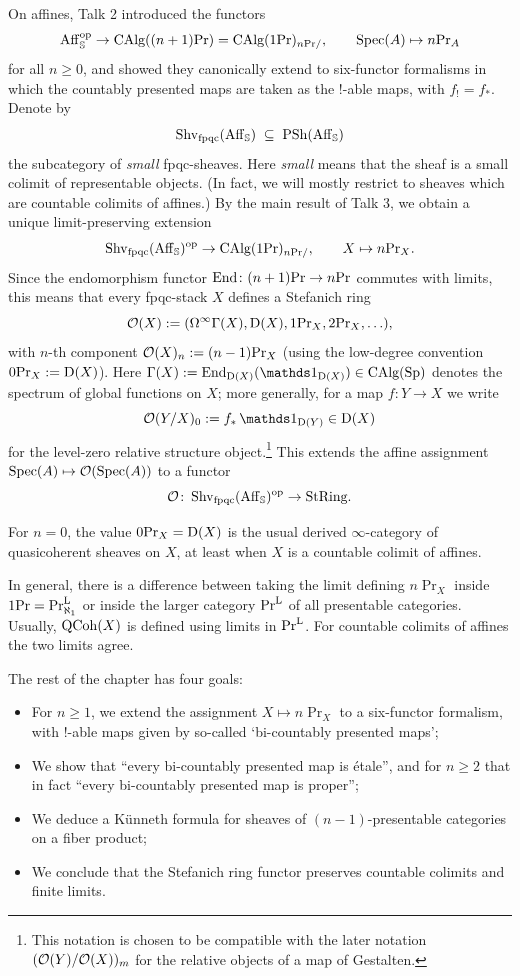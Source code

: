 \documentclass[11pt]{book}
\begin{document}
	On affines, Talk 2 introduced the functors
	\[
		\operatorname{Aff}_{\operatorname{\mathbb S}}^{\textup{op}} \to {\textup{CAlg}}((n+1)\textup{Pr}) = {\textup{CAlg}}(1\textup{Pr})_{n\textup{Pr}/}, \qquad \operatorname{Spec}(A) \mapsto n\textup{Pr}_A
	\]
	for all $n \geq 0$, and showed they canonically extend to six-functor formalisms in which the countably presented maps are taken as the $!$-able maps, with $f_! = f_*$. Denote by
	\[
		\operatorname{Shv}_{\operatorname{fpqc}}(\operatorname{Aff}_{\operatorname{\mathbb S}}) \; \subseteq \; \operatorname{PSh}(\operatorname{Aff}_{\operatorname{\mathbb S}})
	\]	
	the subcategory of \emph{small} fpqc-sheaves. Here \emph{small} means that the sheaf is a small colimit of representable objects. (In fact, we will mostly restrict to sheaves which are countable colimits of affines.) By the main result of Talk 3, we obtain a unique limit-preserving extension
	\[
		\operatorname{Shv}_{\operatorname{fpqc}}(\operatorname{Aff}_{\operatorname{\mathbb S}})^{\textup{op}} \to {\textup{CAlg}}(1\textup{Pr})_{n\textup{Pr}/}, \qquad X \mapsto n\textup{Pr}_X.
	\]
	Since the endomorphism functor $\operatorname{End}\colon (n+1)\textup{Pr} \to n\textup{Pr}$ commutes with limits, this means that every fpqc-stack $X$ defines a Stefanich ring
	\[
		\mathcal{O}(X) := (\Omega^{\infty}\Gamma(X), \operatorname{\mathrm{D}}(X), 1\textup{Pr}_X, 2\textup{Pr}_X, \ldots),
	\]
	with $n$-th component $\mathcal{O}(X)_n := (n-1)\textup{Pr}_X$ (using the low-degree convention $0\textup{Pr}_X := \operatorname{\mathrm{D}}(X)$). Here $\Gamma(X) := \End_{\D(X)}(\unit_{\D(X)}) \in \CAlg(\Sp)$ denotes the spectrum of global functions on $X$; more generally, for a map $f\colon Y \to X$ we write
	\[
		\Oo(Y/X)_0 := f_*\unit_{\D(Y)} \in \D(X)
	\]
	for the level-zero relative structure object.\footnote{This notation is chosen to be compatible with the later notation $(\mathcal{O}(Y)/\mathcal{O}(X))_m$ for the relative objects of a map of Gestalten.} This extends the affine assignment $\operatorname{Spec}(A) \mapsto \mathcal{O}(\operatorname{Spec}(A))$ to a functor
	\[
		\mathcal{O}\colon \operatorname{Shv}_{\operatorname{fpqc}}(\operatorname{Aff}_{\operatorname{\mathbb S}})^{\textup{op}} \to {\textup{StRing}}.
	\]

	For $n = 0$, the value $0\textup{Pr}_X = \operatorname{\mathrm{D}}(X)$ is the usual derived $\infty$-category of quasicoherent sheaves on $X$, at least when $X$ is a countable colimit of affines.

	\begin{remark}
		In general, there is a difference between taking the limit defining $n\Pr_X$ inside $1\textup{Pr} = \textup{Pr}^{\textup{L}}_{\aleph_1}$ or inside the larger category $\textup{Pr}^{\textup{L}}$ of all presentable categories. Usually, $\operatorname{QCoh}(X)$ is defined using limits in $\textup{Pr}^{\textup{L}}$. For countable colimits of affines the two limits agree.
	\end{remark}

	The rest of the chapter has four goals:
	\begin{itemize}
		\item For $n \geq 1$, we extend the assignment $X \mapsto n\Pr_X$ to a six-functor formalism, with $!$-able maps given by so-called `bi-countably presented maps';
		\item We show that ``every bi-countably presented map is étale'', and for $n \geq 2$ that in fact ``every bi-countably presented map is proper'';
		\item We deduce a Künneth formula for sheaves of $(n-1)$-presentable categories on a fiber product;
		\item We conclude that the Stefanich ring functor preserves countable colimits and finite limits.
	\end{itemize}
\end{document}
